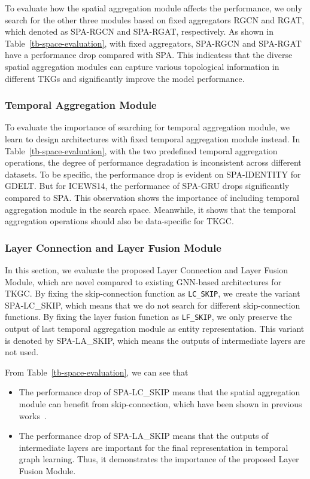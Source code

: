 \documentclass[11pt]{article}
\begin{document}
To evaluate how the spatial aggregation module affects the performance,
we only search for the other three modules based on fixed aggregators RGCN and RGAT, 
which denoted as SPA-RGCN and SPA-RGAT, respectively. 
As shown in Table~\ref{tb-space-evaluation}, 
with fixed aggregators, 
SPA-RGCN and SPA-RGAT have a performance drop compared with SPA.
This indicatess that 
the diverse spatial aggregation modules can 
capture various topological information in different TKGs and significantly improve the model performance.

\subsubsection{Temporal Aggregation Module}

To evaluate the importance of searching for temporal aggregation module, 
we learn to design architectures with fixed temporal aggregation module instead.
In Table~\ref{tb-space-evaluation}, 
with the two predefined temporal aggregation operations, 
the degree of performance degradation is inconsistent across different datasets.
To be specific,
the performance drop is evident on SPA-IDENTITY for GDELT.
But for ICEWS14, 
the performance of SPA-GRU drops significantly compared to SPA.
This observation shows the importance of including temporal aggregation module in the search space.
Meanwhile, 
it shows that the temporal aggregation operations should also be data-specific for TKGC.

\subsubsection{Layer Connection and Layer Fusion Module}

In this section,
we evaluate the proposed Layer Connection and Layer Fusion Module, 
which are novel compared to existing GNN-based architectures for TKGC.
By fixing the skip-connection function as \texttt{LC\_SKIP}, 
we create the variant SPA-LC\_SKIP,
which means that we do not search for different skip-connection functions.
By fixing the layer fusion function as \texttt{LF\_SKIP}, 
we only preserve the output of last temporal aggregation module as entity representation.
This variant is denoted by SPA-LA\_SKIP, 
which means the outputs of intermediate layers are not used.

From Table~\ref{tb-space-evaluation},
we can see that

\begin{itemize}
	\item The performance drop of SPA-LC\_SKIP means that the spatial aggregation module can benefit from skip-connection, which have been shown in previous works~\cite{li2021deepgcns,li2020autograph}.
	\vspace{-5px}
	\item The performance drop of SPA-LA\_SKIP means that the outputs of intermediate layers are important for the final representation in temporal graph learning. Thus, it demonstrates the importance of the proposed Layer Fusion Module.
\end{itemize}
\end{document}
